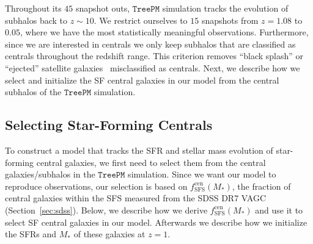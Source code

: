 \documentclass[12pt, letterpaper, preprint, tighten]{aastex62}
\begin{document}
Throughout its $45$ snapshot outs, $\mathtt{TreePM}$ simulation tracks
the evolution of subhalos back to $z \sim 10$. We restrict ourselves to $15$
snapshots from $z = 1.08$ to $0.05$, where we have the most statistically
meaningful observations. Furthermore, since we are interested in centrals we only
keep subhalos that are classified as centrals throughout the redshift
range. This criterion removes ``black splash'' or ``ejected'' satellite
galaxies~\citep[\emph{e.g.}][]{mamon2004,wetzel2014} misclassified as
centrals. Next, we describe how we select and initialize the SF central
galaxies in our model from the central subhalos of the $\mathtt{TreePM}$
simulation.

\subsection{Selecting Star-Forming Centrals}  \label{sec:sfcen}
To construct a model that tracks the SFR and stellar mass evolution of
star-forming central galaxies, we first need to select them from the
central galaxies/subhalos in the $\mathtt{TreePM}$ simulation. Since
we want our model to reproduce observations, our selection is based
on $f^\mathrm{cen}_\mathrm{SFS}(M_*)$, the fraction of central galaxies
within the SFS measured from the SDSS DR7 VAGC (Section~\ref{sec:sdss}).
Below, we describe how we derive $f^\mathrm{cen}_\mathrm{SFS}(M_*)$ and
use it to select SF central galaxies in our model. Afterwards
we describe how we initialize the SFRs and $M_*$ of these galaxies at
$z = 1$.
\end{document}
